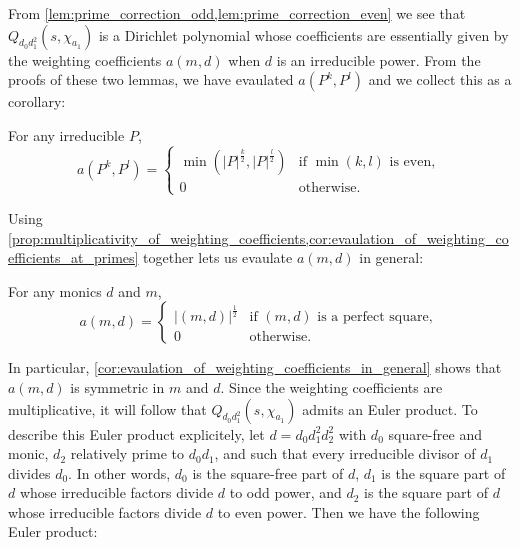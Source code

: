 \documentclass[12pt,reqno,oneside]{amsart}
\begin{document}
    From \cref{lem:prime_correction_odd,lem:prime_correction_even} we see that $Q_{d_{0}d_{1}^{2}}(s,\chi_{a_{1}})$ is a Dirichlet polynomial whose coefficients are essentially given by the weighting coefficients $a(m,d)$ when $d$ is an irreducible power. From the proofs of these two lemmas, we have evaulated $a(P^{k},P^{l})$ and we collect this as a corollary:

    \begin{corollary}\label{cor:evaulation_of_weighting_coefficients_at_primes}
        For any irreducible $P$,
        \[
            a(P^{k},P^{l}) = \begin{cases} \min\left(|P|^{\frac{k}{2}},|P|^{\frac{l}{2}}\right) & \text{if $\min(k,l)$ is even}, \\ 0 & \text{otherwise}. \end{cases}
        \]
    \end{corollary}

    Using \cref{prop:multiplicativity_of_weighting_coefficients,cor:evaulation_of_weighting_coefficients_at_primes} together lets us evaulate $a(m,d)$ in general:

    \begin{corollary}\label{cor:evaulation_of_weighting_coefficients_in_general}
        For any monics $d$ and $m$,
        \[
            a(m,d) = \begin{cases} |(m,d)|^{\frac{1}{2}} & \text{if $(m,d)$ is a perfect square}, \\ 0 & \text{otherwise}. \end{cases}
         \]
    \end{corollary}
    
    In particular, \cref{cor:evaulation_of_weighting_coefficients_in_general} shows that $a(m,d)$ is symmetric in $m$ and $d$. Since the weighting coefficients are multiplicative, it will follow that $Q_{d_{0}d_{1}^{2}}(s,\chi_{a_{1}})$ admits an Euler product. To describe this Euler product explicitely, let $d = d_{0}d_{1}^{2}d_{2}^{2}$ with $d_{0}$ square-free and monic, $d_{2}$ relatively prime to $d_{0}d_{1}$, and such that every irreducible divisor of $d_{1}$ divides $d_{0}$. In other words, $d_{0}$ is the square-free part of $d$, $d_{1}$ is the square part of $d$ whose irreducible factors divide $d$ to odd power, and $d_{2}$ is the square part of $d$ whose irreducible factors divide $d$ to even power. Then we have the following Euler product:
\end{document}
